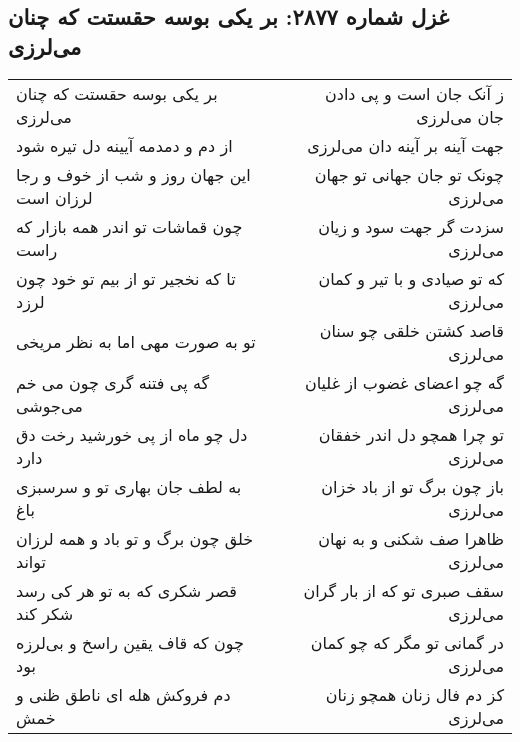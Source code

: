 \begin{center}
\section*{غزل شماره ۲۸۷۷: بر یکی بوسه حقستت که چنان می‌لرزی}
\label{sec:2877}
\begin{longtable}{l p{0.5cm} r}
بر یکی بوسه حقستت که چنان می‌لرزی
&&
ز آنک جان است و پی دادن جان می‌لرزی
\\
از دم و دمدمه آیینه دل تیره شود
&&
جهت آینه بر آینه دان می‌لرزی
\\
این جهان روز و شب از خوف و رجا لرزان است
&&
چونک تو جان جهانی تو جهان می‌لرزی
\\
چون قماشات تو اندر همه بازار که راست
&&
سزدت گر جهت سود و زیان می‌لرزی
\\
تا که نخجیر تو از بیم تو خود چون لرزد
&&
که تو صیادی و با تیر و کمان می‌لرزی
\\
تو به صورت مهی اما به نظر مریخی
&&
قاصد کشتن خلقی چو سنان می‌لرزی
\\
گه پی فتنه گری چون می خم می‌جوشی
&&
گه چو اعضای غضوب از غلیان می‌لرزی
\\
دل چو ماه از پی خورشید رخت دق دارد
&&
تو چرا همچو دل اندر خفقان می‌لرزی
\\
به لطف جان بهاری تو و سرسبزی باغ
&&
باز چون برگ تو از باد خزان می‌لرزی
\\
خلق چون برگ و تو باد و همه لرزان تواند
&&
ظاهرا صف شکنی و به نهان می‌لرزی
\\
قصر شکری که به تو هر کی رسد شکر کند
&&
سقف صبری تو که از بار گران می‌لرزی
\\
چون که قاف یقین راسخ و بی‌لرزه بود
&&
در گمانی تو مگر که چو کمان می‌لرزی
\\
دم فروکش هله ای ناطق ظنی و خمش
&&
کز دم فال زنان همچو زنان می‌لرزی
\\
\end{longtable}
\end{center}
